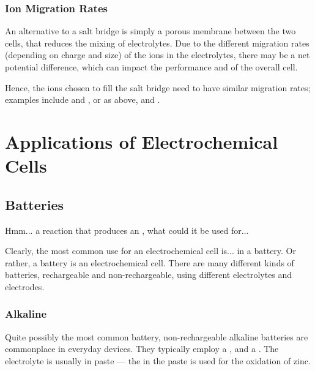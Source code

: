 			\subsubsection{Ion Migration Rates}

				An alternative to a salt bridge is simply a porous membrane between the two cells, that reduces the mixing of electrolytes.
				Due to the different migration rates (depending on charge and size) of the ions in the electrolytes, there may be a net potential
				difference, which can impact the performance and \Ecell{} of the overall cell.

				Hence, the ions chosen to fill the salt bridge need to have similar migration rates; examples include  and , or
				as above,  and \ch{\Cl-}.














	\pagebreak
	\section{Applications of Electrochemical Cells}

		\subsection{Batteries}

			Hmm... a reaction that produces an , what could it be used for...

			Clearly, the most common use for an electrochemical cell is... in a battery. Or rather, a battery is an electrochemical cell.
			There are many different kinds of batteries, rechargeable and non-rechargeable, using different electrolytes and electrodes.


			\subsubsection{Alkaline}

				Quite possibly the most common battery, non-rechargeable alkaline batteries are commonplace in everyday devices. They
				typically employ a , and a . The electrolyte is usually  in 
				paste --- the  in the paste is used for the oxidation of zinc.

